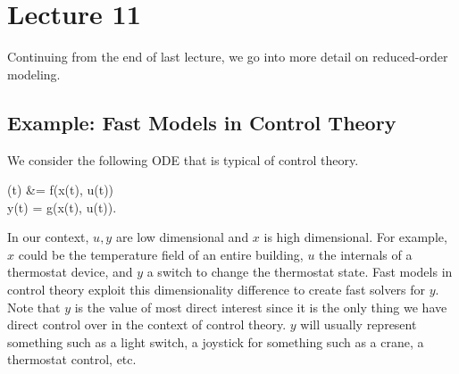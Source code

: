 \chapter{Lecture 11}
Continuing from the end of last lecture, we go into more detail on reduced-order modeling.

\section{Example: Fast Models in Control Theory}
We consider the following ODE that is typical of control theory.
\begin{ceqn} \label{eqn:11:controlODE}
(t) &= f(x(t), u(t)) \\
y(t) = g(x(t), u(t)).
\end{ceqn}
In our context, $u,y$ are low dimensional and $x$ is high dimensional. For example, $x$ could be the temperature field of an entire building, $u$ the internals of a thermostat device, and $y$ a switch to change the thermostat state. Fast models in control theory exploit this dimensionality difference to create fast solvers for $y$. Note that $y$ is the value of most direct interest since it is the only thing we have direct control over in the context of control theory. $y$ will usually represent something such as a light switch, a joystick for something such as a crane, a thermostat control, etc.

